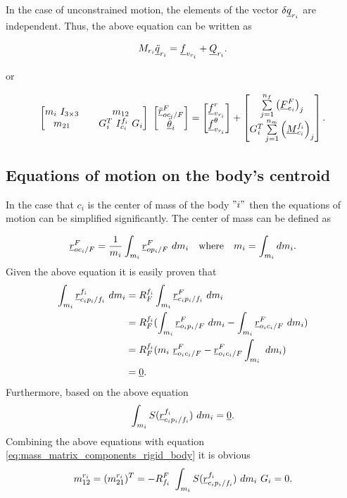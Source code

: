 In the case of unconstrained motion, the elements of the vector 
$\delta \vecd{q}_{r_{i}}$ are independent. Thus, the above equation can 
be written as 


\begin{equation}
    M_{r_i}\vecd{\ddot{q}}_{r_{i}} = \vecd{f}_{v_{r_i}} + \vecd{Q}_{r_i}.
    \label{eq:equations_of_motion_rigid_body}
\end{equation}

or 

\[
    \begin{bmatrix}
        m_{i}\ I_{3 \times 3} && m_{12} \\ m_{21} && G^{T}_{i} \ I^{f_i}_{c_i}\ G_i
    \end{bmatrix}\ \begin{bmatrix}
        \pvec{\ddot{r}}{oc_{i}}{F}{F} \\  \vecd{\ddot{\theta}}_{i}
    \end{bmatrix} = 
    \begin{bmatrix}
      \vecd{f}^{r}_{v_{r_i}} \\ \vecd{f}^{\theta}_{v_{r_i}} 
    \end{bmatrix} 
    + \begin{bmatrix}
        \sum\limits_{j=1}^{n_f}\left(\vecd{F}^{F}_{e_i}\right)_j 
        \\ G^{T}_{i} \sum\limits_{j=1}^{n_m}\left(\vecd{M}_{c_i}^{f_i}\right)_j 
    \end{bmatrix}.
\]

\subsection{Equations of motion on the body's centroid}

In the case that $c_{i}$ is the center of mass of the body $"i"$ then the 
equations of motion can be simplified significantly. The center of mass 
can be defined as 

\[
    \pvec{r}{oc_{i}}{F}{F} = \frac{1}{m_{i}}\int_{m_i} \pvec{r}{op_{i}}{F}{F} \  dm_{i}
    \quad \text{where} \quad m_{i} = \int_{m_i} dm_{i}.
\]
Given the above equation it is easily proven that 
\begin{align*}
    \int_{m_i} \pvec{r}{c_{i}p_{i}}{f_i}{f_i}\ dm_{i} 
    & = \rot{R}{F}{f_i}\int_{m_i} \pvec{r}{c_{i}p_{i}}{f_i}{F}\ dm_{i} \\ 
    & = \rot{R}{F}{f_i}(\int_{m_i} \pvec{r}{o_{i}p_{i}}{F}{F}\ dm_{i} - 
    \int_{m_i} \pvec{r}{o_{i}c_{i}}{F}{F}\ dm_{i}) \\
    & = \rot{R}{F}{f_i}(m_{i}\ \pvec{r}{o_{i}c_{i}}{F}{F} - 
    \pvec{r}{o_{i}c_{i}}{F}{F} \int_{m_i} \ dm_{i}) \\
    & = \vecd{0}.
\end{align*} 
Furthermore, based on the above equation 
\[
    \int_{m_i} S(\pvec{r}{c_{i}p_{i}}{f_i}{f_i})\ dm_{i} = \vecd{0}.
\]
Combining the above equations with equation \eqref{eq:mass_matrix_components_rigid_body}
it is obvious
\[
    m^{r_i}_{12} = (m^{r_i}_{21})^{T} = -\rot{R}{f_{i}}{F}\ \int_{m_i} S(\pvec{r}{c_{i}p_{i}}{f_i}{f_i})\ dm_{i}\ G_{i} = 0.
\]

